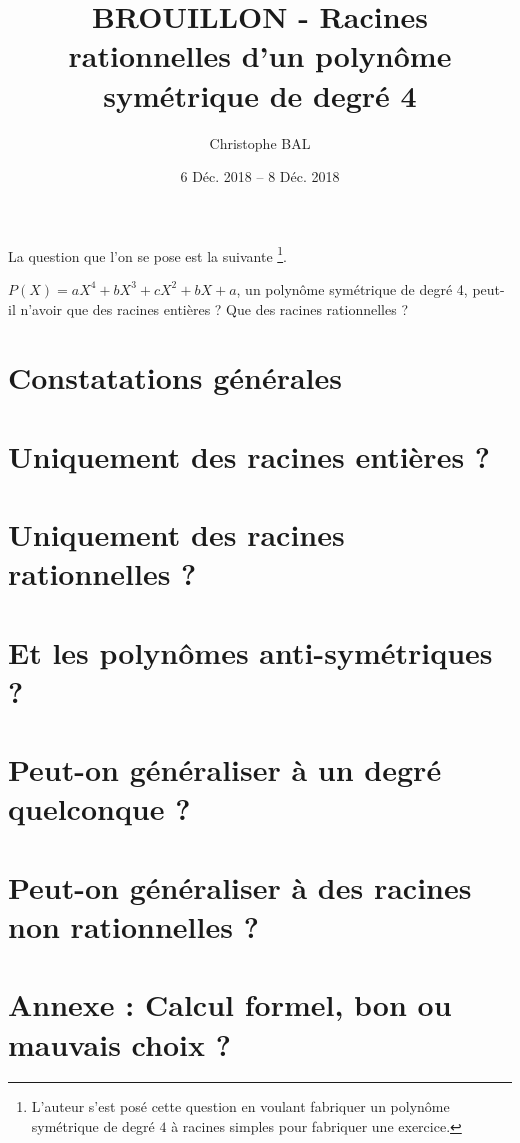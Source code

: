 \documentclass[12pt]{amsart}
\begin{document}
\title{BROUILLON - Racines rationnelles d'un polynôme symétrique de degré 4}
\author{Christophe BAL}
\date{6 Déc. 2018 -- 8 Déc. 2018}
\maketitle


La question que l'on se pose est la suivante
\footnote{
	L'auteur s'est posé cette question en voulant fabriquer un polynôme symétrique de degré $4$ à racines \og simples \fg{} pour fabriquer une exercice.
}.

\begin{tcolorbox}
	$P(X) = a X^4 + b X^3 + c X^2 + b X + a$, un polynôme symétrique de degré 4, peut-il n'avoir que des racines entières ? Que des racines rationnelles ?
\end{tcolorbox}


\setcounter{tocdepth}{1}
\tableofcontents



\section{Constatations générales}





\section{Uniquement des racines entières ?}





\section{Uniquement des racines rationnelles ?}





\section{Et les polynômes anti-symétriques ?}





\section{Peut-on généraliser à un degré quelconque ?}





\section{Peut-on généraliser à des racines non rationnelles ?}





\section*{Annexe : Calcul formel, bon ou mauvais choix ?}


\end{document}
